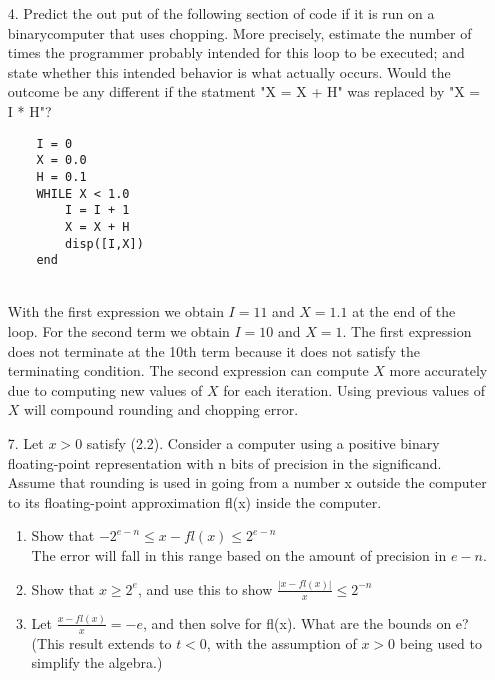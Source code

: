 \documentclass[12pt,letterpaper]{article}
\begin{document}
\begin{enumerate}
	\item[4.] Predict the out put of the following section of code if it is run on a binarycomputer that uses chopping. More precisely, estimate the number of times the programmer probably intended for this loop to be executed; and state whether this intended behavior is what actually occurs. Would the outcome be any different if the statment "X = X + H" was replaced by "X = I * H"?
	\begin{verbatim} 
	I = 0 
	X = 0.0
	H = 0.1
	WHILE X < 1.0
		I = I + 1
		X = X + H 
		disp([I,X]) 
	end
	\end{verbatim} \\
	With the first expression we obtain $I = 11$ and $X = 1.1$ at the end of the loop. 
	For the second term we obtain $I = 10$ and $X = 1$. The first expression does not terminate at the 10th term because it does not satisfy the terminating condition.
	The second expression can compute $X$ more accurately due to computing new values of $X$ for each iteration. Using previous values of $X$ will compound rounding and chopping error. \\ 
	\item[7.] Let $x > 0$ satisfy (2.2). Consider a computer using a positive binary floating-point representation with n bits of precision in the significand. Assume that rounding is used in going from a number x outside the computer to its floating-point approximation fl(x) inside the computer. 
	\begin{enumerate}
		\item Show that $-2^{e - n} \leq x - fl(x) \leq 2^{e - n}$ \\
				The error will fall in this range based on the amount of precision in $e -n$.
		\item Show that $x \geq 2^{e}$, and use this to show $\frac{|x - fl(x)|}{x} \leq 2^{-n}$ 
		\item Let $\frac{x - fl(x)}{x} = -e$, and then solve for fl(x). What are the bounds on e? (This result extends to $t < 0$, with the assumption of $x > 0$ being used to simplify the algebra.) 
	\end{enumerate} 

\end{enumerate} 
\end{document}
